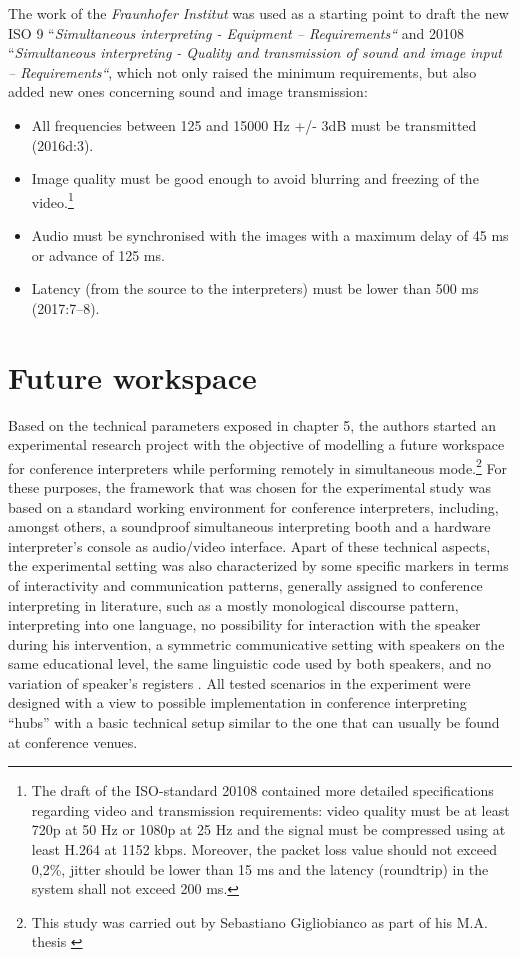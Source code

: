 \documentclass[output=paper]{langsci/langscibook}
\begin{document}
The work of the \textit{Fraunhofer Institut} was used as a starting point to draft the new ISO \citealt{Standards2010}9 “\textit{Simultaneous interpreting - Equipment – Requirements“} and 20108 “\textit{Simultaneous interpreting - Quality and transmission of sound and image input – Requirements“}, which not only raised the minimum requirements, but also added new ones concerning sound and image transmission:

\begin{itemize}
\item All frequencies between 125 and 15000 Hz +/- 3dB must be transmitted (2016d:3).
\item Image quality must be good enough to avoid blurring and freezing of the video.\footnote{The draft of the ISO-standard 20108 contained more detailed specifications regarding video and transmission requirements: video quality must be at least 720p at 50 Hz or 1080p at 25 Hz and the signal must be compressed using at least H.264 at 1152 kbps. Moreover, the packet loss value should not exceed 0,2\%, jitter should be lower than 15 ms and the latency (roundtrip) in the system shall not exceed 200 ms.}
\item Audio must be synchronised with the images with a maximum delay of 45 ms or advance of 125 ms.
\item Latency (from the source to the interpreters) must be lower than 500 ms (2017:7–8).
\end{itemize}
\section{Future workspace}

Based on the technical parameters exposed in chapter 5, the authors started an experimental research project with the objective of modelling a future workspace for conference interpreters while performing remotely in simultaneous mode.\footnote{This study was carried out by Sebastiano Gigliobianco as part of his M.A. thesis \citep{Gigliobianco2017}} For these purposes, the framework that was chosen for the experimental study was based on a standard working environment for conference interpreters, including, amongst others, a soundproof simultaneous interpreting booth and a hardware interpreter’s console as audio/video interface. Apart of these technical aspects, the experimental setting was also characterized by some specific markers in terms of interactivity and communication patterns, generally assigned to conference interpreting in literature, such as a mostly monological discourse pattern, interpreting into one language, no possibility for interaction with the speaker during his intervention, a symmetric communicative setting with speakers on the same educational level, the same linguistic code used by both speakers, and no variation of speaker’s registers \citep[582-583]{Angelelli2000}. All tested scenarios in the experiment were designed with a view to possible implementation in conference interpreting “hubs” with a basic technical setup similar to the one that can usually be found at conference venues.
\end{document}
